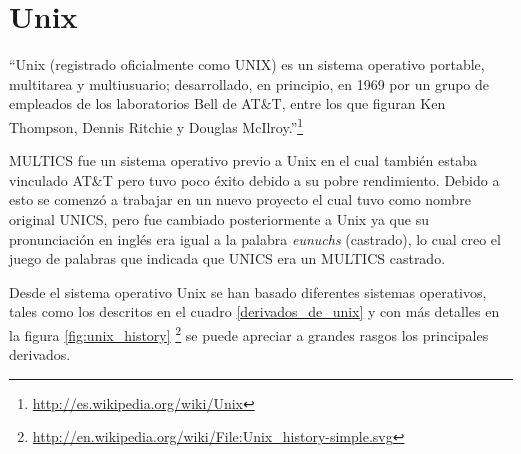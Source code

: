 %
%
%
%

\chapter{Unix}
\label{unix}

``Unix (registrado oficialmente como UNIX\textsuperscript{\textregistered}) es un sistema operativo portable, multitarea y multiusuario; desarrollado, en principio, en 1969 por un grupo de empleados de los laboratorios Bell de AT\&T, entre los que figuran Ken Thompson, Dennis Ritchie y Douglas McIlroy.''\footnote{\url{http://es.wikipedia.org/wiki/Unix}}

MULTICS fue un sistema operativo previo a Unix en el cual también estaba vinculado AT\&T pero tuvo poco éxito debido a su pobre rendimiento. Debido a esto se comenzó a trabajar en un nuevo proyecto el cual tuvo como nombre original UNICS, pero fue cambiado posteriormente a Unix ya que su pronunciación en inglés era igual a la palabra \textit{eunuchs} (castrado), lo cual creo el juego de palabras que indicada que UNICS era un MULTICS castrado.

Desde el sistema operativo Unix se han basado diferentes sistemas operativos, tales como los descritos en el cuadro \ref{derivados_de_unix} y con más detalles en la figura \ref{fig:unix_history} \footnote{\url{http://en.wikipedia.org/wiki/File:Unix_history-simple.svg}} se puede apreciar a grandes rasgos los principales derivados.

